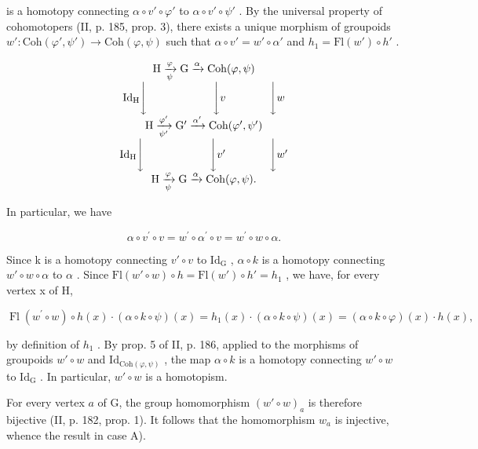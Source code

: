 is a homotopy connecting \(\alpha \circ v' \circ \varphi'\) to \(\alpha \circ v' \circ \psi'\) . By the universal property of cohomotopers (II, p. 185, prop. 3), there exists a unique morphism of groupoids \(w'\colon \mathrm{Coh}(\varphi', \psi') \to \mathrm{Coh}(\varphi, \psi)\) such that \(\alpha \circ v' = w' \circ \alpha'\) and \(h_1 = \mathrm{Fl}(w') \circ h'\) .

\[
\begin{array}{c} \mathrm{H} \xrightarrow [ \psi ]{\varphi} \mathrm{G} \xrightarrow {\alpha} \mathrm{Coh} (\varphi , \psi) \\ \mathrm{Id} _ {\mathrm{H}} \Biggl \downarrow \qquad \qquad \qquad \Biggl \downarrow v \qquad \qquad \Biggl \downarrow w \\ \mathrm{H} \xrightarrow [ \psi^ {\prime} ]{\varphi^ {\prime}} \mathrm{G} ^ {\prime} \xrightarrow {\alpha^ {\prime}} \mathrm{Coh} (\varphi^ {\prime}, \psi^ {\prime}) \\ \mathrm{Id} _ {\mathrm{H}} \Biggl \downarrow \qquad \qquad \qquad \Biggl \downarrow v ^ {\prime} \qquad \qquad \Biggl \downarrow w ^ {\prime} \\ \mathrm{H} \xrightarrow [ \psi ]{\varphi} \mathrm{G} \xrightarrow {\alpha} \mathrm{Coh} (\varphi , \psi)  . \end{array}
\]

In particular, we have

\[
\alpha \circ v ^ {\prime} \circ v = w ^ {\prime} \circ \alpha^ {\prime} \circ v = w ^ {\prime} \circ w \circ \alpha .
\]

Since k is a homotopy connecting \(v'\circ v\) to \(\mathrm{Id}_{\mathrm{G}}\) , \(\alpha\circ k\) is a homotopy connecting \(w'\circ w\circ\alpha\) to \(\alpha\) . Since \(\mathrm{Fl}(w'\circ w)\circ h=\mathrm{Fl}(w')\circ h'=h_{1}\) , we have, for every vertex x of H,

\[
\operatorname{Fl} \left(w ^ {\prime} \circ w\right) \circ h (x) \cdot (\alpha \circ k \circ \psi) (x) = h _ {1} (x) \cdot (\alpha \circ k \circ \psi) (x) = (\alpha \circ k \circ \varphi) (x) \cdot h (x),
\]

by definition of \(h_1\) . By prop. 5 of II, p. 186, applied to the morphisms of groupoids \(w' \circ w\) and \(\mathrm{Id}_{\mathrm{Coh}(\varphi, \psi)}\) , the map \(\alpha \circ k\) is a homotopy connecting \(w' \circ w\) to \(\mathrm{Id}_{\mathrm{G}}\) . In particular, \(w' \circ w\) is a homotopism.

For every vertex \(a\) of G, the group homomorphism \((w' \circ w)_a\) is therefore bijective (II, p. 182, prop. 1). It follows that the homomorphism \(w_a\) is injective, whence the result in case A).

